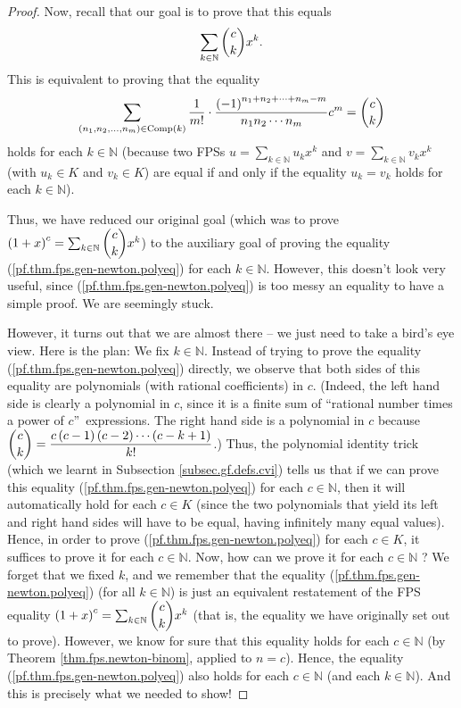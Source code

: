 \begin{proof}
Now, recall that our goal is to prove that this equals
\[
\sum_{k\in\mathbb{N}}\dbinom{c}{k}x^{k}.
\]
This is equivalent to proving that the equality%
\begin{equation}
\sum_{\left(  n_{1},n_{2},\ldots,n_{m}\right)  \in\operatorname*{Comp}\left(
k\right)  }\dfrac{1}{m!}\cdot\dfrac{\left(  -1\right)  ^{n_{1}+n_{2}%
+\cdots+n_{m}-m}}{n_{1}n_{2}\cdots n_{m}}c^{m}=\dbinom{c}{k}
\label{pf.thm.fps.gen-newton.polyeq}%
\end{equation}
holds for each $k\in\mathbb{N}$ (because two FPSs $u=\sum_{k\in\mathbb{N}%
}u_{k}x^{k}$ and $v=\sum_{k\in\mathbb{N}}v_{k}x^{k}$ (with $u_{k}\in K$ and
$v_{k}\in K$) are equal if and only if the equality $u_{k}=v_{k}$ holds for
each $k\in\mathbb{N}$).

Thus, we have reduced our original goal (which was to prove $\left(
1+x\right)  ^{c}=\sum_{k\in\mathbb{N}}\dbinom{c}{k}x^{k}$) to the auxiliary
goal of proving the equality (\ref{pf.thm.fps.gen-newton.polyeq}) for each
$k\in\mathbb{N}$. However, this doesn't look very useful, since
(\ref{pf.thm.fps.gen-newton.polyeq}) is too messy an equality to have a simple
proof. We are seemingly stuck.

However, it turns out that we are almost there -- we just need to take a
bird's eye view. Here is the plan: We fix $k\in\mathbb{N}$. Instead of trying
to prove the equality (\ref{pf.thm.fps.gen-newton.polyeq}) directly, we
observe that both sides of this equality are polynomials (with rational
coefficients) in $c$. (Indeed, the left hand side is clearly a polynomial in
$c$, since it is a finite sum of \textquotedblleft rational number times a
power of $c$\textquotedblright\ expressions. The right hand side is a
polynomial in $c$ because $\dbinom{c}{k}=\dfrac{c\left(  c-1\right)  \left(
c-2\right)  \cdots\left(  c-k+1\right)  }{k!}$.) Thus, the polynomial identity
trick (which we learnt in Subsection \ref{subsec.gf.defs.cvi}) tells us that
if we can prove this equality (\ref{pf.thm.fps.gen-newton.polyeq}) for each
$c\in\mathbb{N}$, then it will automatically hold for each $c\in K$ (since the
two polynomials that yield its left and right hand sides will have to be
equal, having infinitely many equal values). Hence, in order to prove
(\ref{pf.thm.fps.gen-newton.polyeq}) for each $c\in K$, it suffices to prove
it for each $c\in\mathbb{N}$. Now, how can we prove it for each $c\in
\mathbb{N}$ ? We forget that we fixed $k$, and we remember that the equality
(\ref{pf.thm.fps.gen-newton.polyeq}) (for all $k\in\mathbb{N}$) is just an
equivalent restatement of the FPS equality $\left(  1+x\right)  ^{c}%
=\sum_{k\in\mathbb{N}}\dbinom{c}{k}x^{k}$ (that is, the equality we have
originally set out to prove). However, we know for sure that this equality
holds for each $c\in\mathbb{N}$ (by Theorem \ref{thm.fps.newton-binom},
applied to $n=c$). Hence, the equality (\ref{pf.thm.fps.gen-newton.polyeq})
also holds for each $c\in\mathbb{N}$ (and each $k\in\mathbb{N}$). And this is
precisely what we needed to show!


\end{proof}
